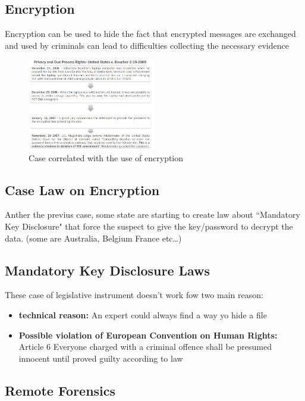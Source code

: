 \subsection{Encryption}
Encryption can be used to hide the fact that encrypted messages are exchanged and used by criminals can lead to difficulties collecting the necessary evidence

\begin{figure}[!ht]
  \centering
  \includegraphics[width=0.5\textwidth]{img/enc_case.png}
  \caption{Case correlated with the use of encryption}
  \label{fig:encryption process}
\end{figure}

\newpage
\subsection{Case Law on Encryption}
Anther the previus case, some state are starting to create law about “Mandatory Key Disclosure" that force the suspect to give the key/password to decrypt the data. (some are Australia, Belgium France etc\dots)

\subsection{Mandatory Key Disclosure Laws}
These case of legislative instrument doesn't work fow two main reason:
\begin{itemize}
  \item \textbf{technical reason:} An expert could always find a way yo hide a file
  \item \textbf{Possible violation of European Convention on Human Rights:} Article 6 Everyone charged with a criminal offence shall be presumed innocent until proved guilty according to law
\end{itemize}


\subsection{Remote Forensics}

